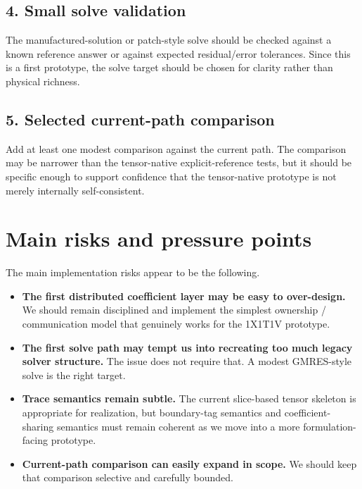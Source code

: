 \documentclass[11pt]{article}
\begin{document}
\subsection{4. Small solve validation}

The manufactured-solution or patch-style solve should be checked against a known reference answer or against expected residual/error tolerances. Since this is a first prototype, the solve target should be chosen for clarity rather than physical richness.

\subsection{5. Selected current-path comparison}

Add at least one modest comparison against the current path. The comparison may be narrower than the tensor-native explicit-reference tests, but it should be specific enough to support confidence that the tensor-native prototype is not merely internally self-consistent.

\section{Main risks and pressure points}

The main implementation risks appear to be the following.

\begin{itemize}[leftmargin=2em]
\item \textbf{The first distributed coefficient layer may be easy to over-design.} We should remain disciplined and implement the simplest ownership / communication model that genuinely works for the 1X1T1V prototype.

\item \textbf{The first solve path may tempt us into recreating too much legacy solver structure.} The issue does not require that. A modest GMRES-style solve is the right target.

\item \textbf{Trace semantics remain subtle.} The current slice-based tensor skeleton is appropriate for realization, but boundary-tag semantics and coefficient-sharing semantics must remain coherent as we move into a more formulation-facing prototype.

\item \textbf{Current-path comparison can easily expand in scope.} We should keep that comparison selective and carefully bounded.
\end{itemize}
\end{document}
